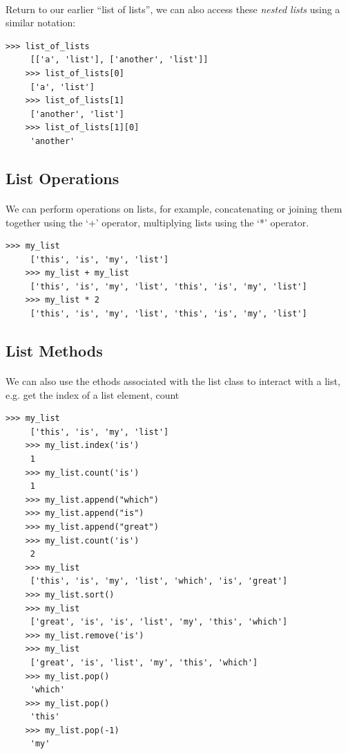 \documentclass[12pt, a4paper, oneside]{book}
\begin{document}
{\paragraph{} Return to our earlier ``list of lists'', we can also access these \emph{nested lists} using a similar notation:

\begin{lstlisting}[style=DOS]
    >>> list_of_lists
     [['a', 'list'], ['another', 'list']]
    >>> list_of_lists[0]
     ['a', 'list']
    >>> list_of_lists[1]
     ['another', 'list']
    >>> list_of_lists[1][0]
     'another'
\end{lstlisting}

\subsection{List Operations}

\paragraph{} We can perform operations on lists, for example, concatenating or joining them together using the `+' operator, multiplying lists using the `*' operator.

\begin{lstlisting}[style=DOS]
    >>> my_list
     ['this', 'is', 'my', 'list']
    >>> my_list + my_list
     ['this', 'is', 'my', 'list', 'this', 'is', 'my', 'list']
    >>> my_list * 2
     ['this', 'is', 'my', 'list', 'this', 'is', 'my', 'list']
\end{lstlisting}

\subsection{List Methods}

\paragraph{} We can also use the ethods associated with the list class to interact with a list, e.g. get the index of a list element, count 

\begin{lstlisting}[style=DOS]
    >>> my_list 
     ['this', 'is', 'my', 'list']
    >>> my_list.index('is')
     1
    >>> my_list.count('is')
     1
    >>> my_list.append("which")
    >>> my_list.append("is")
    >>> my_list.append("great")
    >>> my_list.count('is')
     2
    >>> my_list
     ['this', 'is', 'my', 'list', 'which', 'is', 'great']
    >>> my_list.sort()
    >>> my_list
     ['great', 'is', 'is', 'list', 'my', 'this', 'which']
    >>> my_list.remove('is')
    >>> my_list
     ['great', 'is', 'list', 'my', 'this', 'which']
    >>> my_list.pop()
     'which'
    >>> my_list.pop()
     'this'
    >>> my_list.pop(-1)
     'my'
\end{lstlisting}

}
\end{document}
